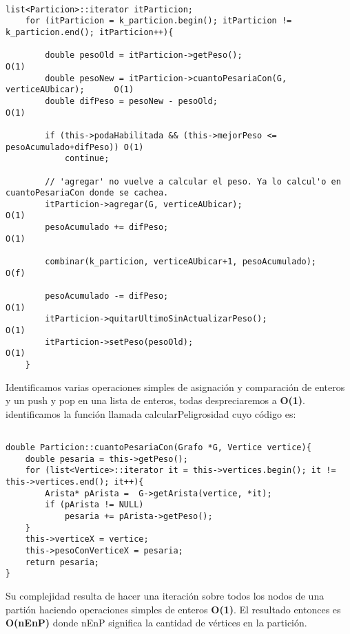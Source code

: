 \begin{lstlisting}

list<Particion>::iterator itParticion;
	for (itParticion = k_particion.begin(); itParticion != k_particion.end(); itParticion++){

		double pesoOld = itParticion->getPeso();								O(1)
		double pesoNew = itParticion->cuantoPesariaCon(G, verticeAUbicar);		O(1)
		double difPeso = pesoNew - pesoOld;										O(1)

		if (this->podaHabilitada && (this->mejorPeso <= pesoAcumulado+difPeso))	O(1)
			continue;

		// 'agregar' no vuelve a calcular el peso. Ya lo calcul'o en cuantoPesariaCon donde se cachea.
		itParticion->agregar(G, verticeAUbicar);								O(1)
		pesoAcumulado += difPeso;												O(1)

		combinar(k_particion, verticeAUbicar+1, pesoAcumulado);					O(f)

		pesoAcumulado -= difPeso;												O(1)
		itParticion->quitarUltimoSinActualizarPeso();							O(1)
		itParticion->setPeso(pesoOld);											O(1)
	}
\end{lstlisting}

\noindent 
Identificamos varias operaciones simples de asignaci\'on y comparaci\'on de enteros y un push y pop en una lista de enteros, todas despreciaremos a \textbf{O(1)}. \\
identificamos la funci\'on llamada calcularPeligrosidad cuyo c\'odigo es:

\begin{lstlisting}

double Particion::cuantoPesariaCon(Grafo *G, Vertice vertice){
	double pesaria = this->getPeso();
	for (list<Vertice>::iterator it = this->vertices.begin(); it != this->vertices.end(); it++){
		Arista* pArista =  G->getArista(vertice, *it);
		if (pArista != NULL) 
			pesaria += pArista->getPeso();
	}
	this->verticeX = vertice;
	this->pesoConVerticeX = pesaria;
	return pesaria;
}
\end{lstlisting}

\noindent 
Su complejidad resulta de hacer una iteraci\'on sobre todos los nodos de una parti\'on haciendo operaciones simples de enteros \textbf{O(1)}. El resultado entonces es \textbf{O(nEnP)} donde nEnP significa la cantidad de v\'ertices en la partici\'on. 

